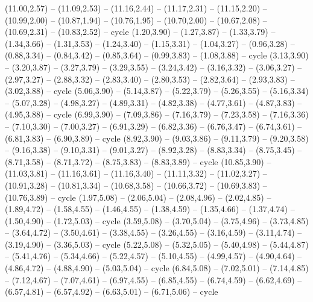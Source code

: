 \expandafter\def\csname geo:Tissot:k12\endcsname{
  (11.00,2.57) -- (11.09,2.53) -- (11.16,2.44) -- (11.17,2.31) -- (11.15,2.20) -- (10.99,2.00) -- (10.87,1.94) -- (10.76,1.95) -- (10.70,2.00) -- (10.67,2.08) -- (10.69,2.31) -- (10.83,2.52) -- cycle}
\expandafter\def\csname geo:Tissot:k13\endcsname{
  (1.20,3.90) -- (1.27,3.87) -- (1.33,3.79) -- (1.34,3.66) -- (1.31,3.53) -- (1.24,3.40) -- (1.15,3.31) -- (1.04,3.27) -- (0.96,3.28) -- (0.88,3.34) -- (0.84,3.42) -- (0.85,3.64) -- (0.99,3.83) -- (1.08,3.88) -- cycle}
\expandafter\def\csname geo:Tissot:k14\endcsname{
  (3.13,3.90) -- (3.20,3.87) -- (3.27,3.79) -- (3.29,3.55) -- (3.24,3.42) -- (3.16,3.32) -- (3.06,3.27) -- (2.97,3.27) -- (2.88,3.32) -- (2.83,3.40) -- (2.80,3.53) -- (2.82,3.64) -- (2.93,3.83) -- (3.02,3.88) -- cycle}
\expandafter\def\csname geo:Tissot:k15\endcsname{
  (5.06,3.90) -- (5.14,3.87) -- (5.22,3.79) -- (5.26,3.55) -- (5.16,3.34) -- (5.07,3.28) -- (4.98,3.27) -- (4.89,3.31) -- (4.82,3.38) -- (4.77,3.61) -- (4.87,3.83) -- (4.95,3.88) -- cycle}
\expandafter\def\csname geo:Tissot:k16\endcsname{
  (6.99,3.90) -- (7.09,3.86) -- (7.16,3.79) -- (7.23,3.58) -- (7.16,3.36) -- (7.10,3.30) -- (7.00,3.27) -- (6.91,3.29) -- (6.82,3.36) -- (6.76,3.47) -- (6.74,3.61) -- (6.81,3.83) -- (6.90,3.89) -- cycle}
\expandafter\def\csname geo:Tissot:k17\endcsname{
  (8.92,3.90) -- (9.03,3.86) -- (9.11,3.79) -- (9.20,3.58) -- (9.16,3.38) -- (9.10,3.31) -- (9.01,3.27) -- (8.92,3.28) -- (8.83,3.34) -- (8.75,3.45) -- (8.71,3.58) -- (8.71,3.72) -- (8.75,3.83) -- (8.83,3.89) -- cycle}
\expandafter\def\csname geo:Tissot:k18\endcsname{
  (10.85,3.90) -- (11.03,3.81) -- (11.16,3.61) -- (11.16,3.40) -- (11.11,3.32) -- (11.02,3.27) -- (10.91,3.28) -- (10.81,3.34) -- (10.68,3.58) -- (10.66,3.72) -- (10.69,3.83) -- (10.76,3.89) -- cycle}
\expandafter\def\csname geo:Tissot:k19\endcsname{
  (1.97,5.08) -- (2.06,5.04) -- (2.08,4.96) -- (2.02,4.85) -- (1.89,4.72) -- (1.58,4.55) -- (1.46,4.55) -- (1.38,4.59) -- (1.35,4.66) -- (1.37,4.74) -- (1.50,4.90) -- (1.72,5.03) -- cycle}
\expandafter\def\csname geo:Tissot:k20\endcsname{
  (3.59,5.08) -- (3.70,5.04) -- (3.75,4.96) -- (3.73,4.85) -- (3.64,4.72) -- (3.50,4.61) -- (3.38,4.55) -- (3.26,4.55) -- (3.16,4.59) -- (3.11,4.74) -- (3.19,4.90) -- (3.36,5.03) -- cycle}
\expandafter\def\csname geo:Tissot:k21\endcsname{
  (5.22,5.08) -- (5.32,5.05) -- (5.40,4.98) -- (5.44,4.87) -- (5.41,4.76) -- (5.34,4.66) -- (5.22,4.57) -- (5.10,4.55) -- (4.99,4.57) -- (4.90,4.64) -- (4.86,4.72) -- (4.88,4.90) -- (5.03,5.04) -- cycle}
\expandafter\def\csname geo:Tissot:k22\endcsname{
  (6.84,5.08) -- (7.02,5.01) -- (7.14,4.85) -- (7.12,4.67) -- (7.07,4.61) -- (6.97,4.55) -- (6.85,4.55) -- (6.74,4.59) -- (6.62,4.69) -- (6.57,4.81) -- (6.57,4.92) -- (6.63,5.01) -- (6.71,5.06) -- cycle}
